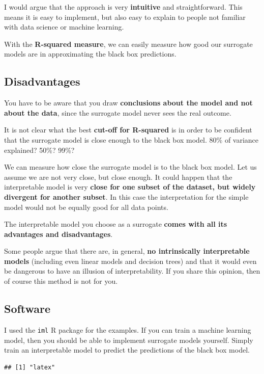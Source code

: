 \documentclass[
  11pt,
]{scrbook}
\begin{document}
I would argue that the approach is very \textbf{intuitive} and straightforward.
This means it is easy to implement, but also easy to explain to people not familiar with data science or machine learning.

With the \textbf{R-squared measure}, we can easily measure how good our surrogate models are in approximating the black box predictions.

\hypertarget{disadvantages-10}{%
\subsection{Disadvantages}\label{disadvantages-10}}

You have to be aware that you draw \textbf{conclusions about the model and not about the data}, since the surrogate model never sees the real outcome.

It is not clear what the best \textbf{cut-off for R-squared} is in order to be confident that the surrogate model is close enough to the black box model.
80\% of variance explained? 50\%? 99\%?

We can measure how close the surrogate model is to the black box model.
Let us assume we are not very close, but close enough.
It could happen that the interpretable model is very \textbf{close for one subset of the dataset, but widely divergent for another subset}.
In this case the interpretation for the simple model would not be equally good for all data points.

The interpretable model you choose as a surrogate \textbf{comes with all its advantages and disadvantages}.

Some people argue that there are, in general, \textbf{no intrinsically interpretable models} (including even linear models and decision trees) and that it would even be dangerous to have an illusion of interpretability.
If you share this opinion, then of course this method is not for you.

\hypertarget{software-4}{%
\subsection{Software}\label{software-4}}

I used the \texttt{iml} R package for the examples.
If you can train a machine learning model, then you should be able to implement surrogate models yourself.
Simply train an interpretable model to predict the predictions of the black box model.

\begin{verbatim}
## [1] "latex"
\end{verbatim}
\end{document}
